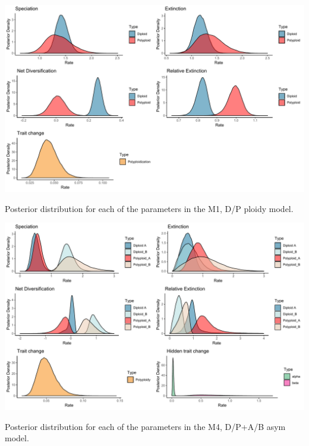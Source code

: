 

\begin{suppfigure}
\includegraphics[width=\textwidth]{bisseDPnodipposteriordist.pdf}
\caption{Posterior distribution for each of the parameters in the M1, D/P ploidy model.} %
\label{suppfigure:DPnodip}
\end{suppfigure}

\begin{suppfigure}
\includegraphics[width=\textwidth]{hisseDPnodipasymposteriordist.pdf}
\caption{Posterior distribution for each of the parameters in the M4, D/P+A/B asym model.} %
\label{suppfigure:DPnodipAB}
\end{suppfigure}

